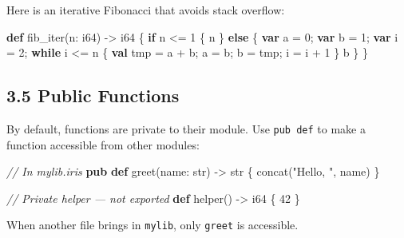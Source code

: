 \documentclass[
  english,
]{book}
\newenvironment{Shaded}{\begin{snugshade}}{\end{snugshade}}
\newcommand{\CommentTok}[1]{\textcolor[rgb]{0.42,0.60,0.33}{\textit{#1}}}
\newcommand{\ControlFlowTok}[1]{\textcolor[rgb]{0.77,0.53,0.75}{\textbf{#1}}}
\newcommand{\DataTypeTok}[1]{\textcolor[rgb]{0.31,0.79,0.69}{#1}}
\newcommand{\DecValTok}[1]{\textcolor[rgb]{0.71,0.81,0.66}{#1}}
\newcommand{\FunctionTok}[1]{\textcolor[rgb]{0.86,0.86,0.67}{#1}}
\newcommand{\KeywordTok}[1]{\textcolor[rgb]{0.34,0.61,0.84}{\textbf{#1}}}
\newcommand{\NormalTok}[1]{\textcolor[rgb]{0.83,0.83,0.83}{#1}}
\newcommand{\OperatorTok}[1]{\textcolor[rgb]{0.83,0.83,0.83}{#1}}
\newcommand{\StringTok}[1]{\textcolor[rgb]{0.81,0.57,0.47}{#1}}
\begin{document}
Here is an iterative Fibonacci that avoids stack overflow:

\begin{Shaded}
\begin{Highlighting}[]
\KeywordTok{def}\NormalTok{ fib\_iter(n: }\DataTypeTok{i64}\NormalTok{) }\OperatorTok{{-}\textgreater{}} \DataTypeTok{i64}\NormalTok{ \{}
    \ControlFlowTok{if}\NormalTok{ n }\OperatorTok{\textless{}=} \DecValTok{1}\NormalTok{ \{}
\NormalTok{        n}
\NormalTok{    \} }\ControlFlowTok{else}\NormalTok{ \{}
        \KeywordTok{var}\NormalTok{ a }\OperatorTok{=} \DecValTok{0}\NormalTok{;}
        \KeywordTok{var}\NormalTok{ b }\OperatorTok{=} \DecValTok{1}\NormalTok{;}
        \KeywordTok{var}\NormalTok{ i }\OperatorTok{=} \DecValTok{2}\NormalTok{;}
        \ControlFlowTok{while}\NormalTok{ i }\OperatorTok{\textless{}=}\NormalTok{ n \{}
            \KeywordTok{val}\NormalTok{ tmp }\OperatorTok{=}\NormalTok{ a }\OperatorTok{+}\NormalTok{ b;}
\NormalTok{            a }\OperatorTok{=}\NormalTok{ b;}
\NormalTok{            b }\OperatorTok{=}\NormalTok{ tmp;}
\NormalTok{            i }\OperatorTok{=}\NormalTok{ i }\OperatorTok{+} \DecValTok{1}
\NormalTok{        \}}
\NormalTok{        b}
\NormalTok{    \}}
\NormalTok{\}}
\end{Highlighting}
\end{Shaded}

\subsection{3.5 Public Functions}\label{public-functions}

By default, functions are private to their module. Use \texttt{pub\ def}
to make a function accessible from other modules:

\begin{Shaded}
\begin{Highlighting}[]
\CommentTok{// In mylib.iris}
\KeywordTok{pub} \KeywordTok{def}\NormalTok{ greet(name: }\DataTypeTok{str}\NormalTok{) }\OperatorTok{{-}\textgreater{}} \DataTypeTok{str}\NormalTok{ \{}
    \FunctionTok{concat}\NormalTok{(}\StringTok{"Hello, "}\NormalTok{, name)}
\NormalTok{\}}

\CommentTok{// Private helper — not exported}
\KeywordTok{def}\NormalTok{ helper() }\OperatorTok{{-}\textgreater{}} \DataTypeTok{i64}\NormalTok{ \{}
    \DecValTok{42}
\NormalTok{\}}
\end{Highlighting}
\end{Shaded}

When another file brings in \texttt{mylib}, only \texttt{greet} is
accessible.
\end{document}

